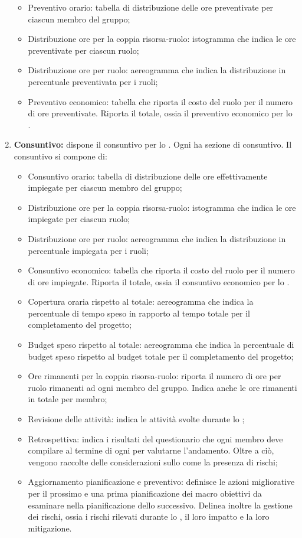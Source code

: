 \begin{enumerate}
  \begin{itemize}
    \item Preventivo orario: tabella di distribuzione delle ore preventivate per ciascun membro del gruppo;
    \item Distribuzione ore per la coppia risorsa-ruolo: istogramma che indica le ore preventivate per ciascun ruolo;
    \item Distribuzione ore per ruolo: aereogramma che indica la distribuzione in percentuale preventivata per i ruoli;
    \item Preventivo economico: tabella che riporta il costo del ruolo per il numero di ore preventivate. Riporta il totale, ossia il preventivo economico per lo .
  \end{itemize}
  \item \textbf{Consuntivo:} dispone il consuntivo per lo . Ogni  ha sezione di consuntivo. Il consuntivo si compone di:
  \begin{itemize}
    \item Consuntivo orario: tabella di distribuzione delle ore effettivamente impiegate per ciascun membro del gruppo;
    \item Distribuzione ore per la coppia risorsa-ruolo: istogramma che indica le ore impiegate per ciascun ruolo;
    \item Distribuzione ore per ruolo: aereogramma che indica la distribuzione in percentuale impiegata per i ruoli;
    \item Consuntivo economico: tabella che riporta il costo del ruolo per il numero di ore impiegate. Riporta il totale, ossia il consuntivo economico per lo .
    \item Copertura oraria rispetto al totale: aereogramma che indica la percentuale di tempo speso in rapporto al tempo totale per il completamento del progetto;
    \item Budget speso rispetto al totale: aereogramma che indica la percentuale di budget speso rispetto al budget totale per il completamento del progetto;
    \item Ore rimanenti per la coppia risorsa-ruolo: riporta il numero di ore per ruolo rimanenti ad ogni membro del gruppo. Indica anche le ore rimanenti in totale per membro;
    \item Revisione delle attività: indica le attività svolte durante lo ;
    \item Retrospettiva: indica i risultati del questionario che ogni membro deve compilare al termine di ogni  per valutarne l'andamento. Oltre a ciò, vengono raccolte delle considerazioni sullo  come la presenza di rischi;
    \item Aggiornamento pianificazione e preventivo: definisce le azioni migliorative per il prossimo  e una prima pianificazione dei macro obiettivi da esaminare nella pianificazione dello  successivo. Delinea inoltre la gestione dei rischi, ossia i rischi rilevati durante lo , il loro impatto e la loro mitigazione.
  \end{itemize}
\end{enumerate} 

